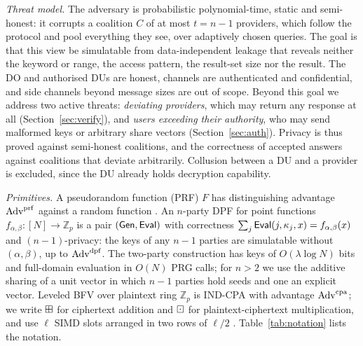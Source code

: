 \emph{Threat model.} The adversary is probabilistic polynomial-time, static
and semi-honest: it corrupts a coalition $C$ of at most $t=n-1$ providers,
which follow the protocol and pool everything they see, over adaptively chosen
queries. The goal is that this view be simulatable from data-independent
leakage that reveals neither the keyword or range, the access pattern, the
result-set size nor the result. The DO and authorised DUs are honest, channels
are authenticated and confidential, and side channels beyond message sizes are
out of scope. Beyond this goal we address two active threats:
\emph{deviating providers}, which may return any response at all
(Section~\ref{sec:verify}), and \emph{users exceeding their authority}, who
may send malformed keys or arbitrary share vectors (Section~\ref{sec:auth}).
Privacy is thus proved against semi-honest coalitions, and the correctness of
accepted answers against coalitions that deviate arbitrarily.
Collusion between a DU and a provider is excluded, since the DU already holds
decryption capability.

\emph{Primitives.} A pseudorandom function (PRF) $F$ has distinguishing
advantage $\mathrm{Adv}^{\mathrm{prf}}$ against a random function \citep{goldreich2019construct}.
An $n$-party DPF \citep{gilboa2014distributed,boyle2015function,boyle2016function}
for point functions $f_{\alpha,\beta}:[N]\to\mathbb{Z}_p$ is a pair
$(\mathsf{Gen},\mathsf{Eval})$ with correctness $\sum_j\mathsf{Eval}(j,\kappa_j,x)=f_{\alpha,\beta}(x)$
and $(n{-}1)$-privacy: the keys of any $n-1$ parties are simulatable without
$(\alpha,\beta)$, up to $\mathrm{Adv}^{\mathrm{dpf}}$. The two-party construction has keys of
$O(\lambda\log N)$ bits and full-domain evaluation in $O(N)$ PRG calls; for
$n>2$ we use the additive sharing of a unit vector in which $n-1$ parties hold
seeds and one an explicit vector. Leveled BFV
\citep{fan2012somewhat,cryptoeprint:2016/421} over plaintext ring
$\mathbb{Z}_p$ is IND-CPA with advantage $\mathrm{Adv}^{\mathrm{cpa}}$; we write $\boxplus$ for
ciphertext addition and $\boxdot$ for plaintext-ciphertext multiplication, and
use $\ell$ SIMD slots arranged in two rows of $\ell/2$
\citep{halevi2014algorithms}. Table~\ref{tab:notation} lists the notation.

